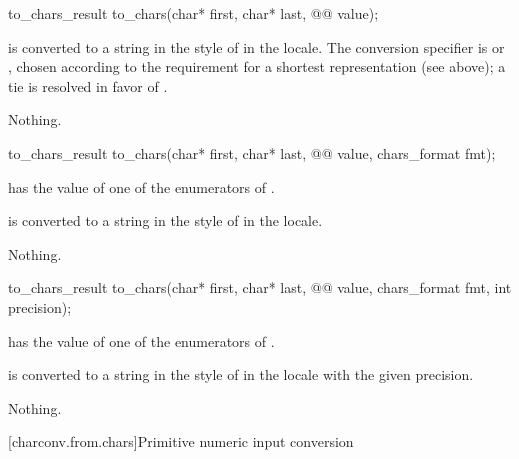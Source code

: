 %
\begin{itemdecl}
to_chars_result to_chars(char* first, char* last, @@ value);
\end{itemdecl}

\begin{itemdescr}
\pnum
\effects
{} is converted to a string
in the style of 
in the  locale.
The conversion specifier is  or ,
chosen according to the requirement for a shortest representation
(see above);
a tie is resolved in favor of .

\pnum
\throws
Nothing.
\end{itemdescr}

%
\begin{itemdecl}
to_chars_result to_chars(char* first, char* last, @@ value, chars_format fmt);
\end{itemdecl}

\begin{itemdescr}
\pnum
\expects
{} has the value of
one of the enumerators of .

\pnum
\effects
{} is converted to a string
in the style of 
in the  locale.

\pnum
\throws
Nothing.
\end{itemdescr}

%
\begin{itemdecl}
to_chars_result to_chars(char* first, char* last, @@ value,
                         chars_format fmt, int precision);
\end{itemdecl}

\begin{itemdescr}
\pnum
\expects
{} has the value of
one of the enumerators of .

\pnum
\effects
{} is converted to a string
in the style of 
in the  locale
with the given precision.

\pnum
\throws
Nothing.
\end{itemdescr}


[charconv.from.chars]{Primitive numeric input conversion}

